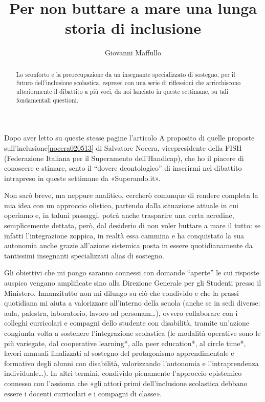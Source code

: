 \author{Giovanni Maffullo}
\title{Per non buttare a mare una lunga storia di inclusione }
\label{cha:maffullo100513}
\begin{abstract}
Lo sconforto e la preoccupazione da un insegnante specializzato di sostegno, per il futuro dell'inclusione scolastica, espressi con una serie di riflessioni che arricchiscono ulteriormente il dibattito a più voci, da noi lanciato in queste settimane, su tali fondamentali questioni. 
\end{abstract}
\maketitle
Dopo aver letto su queste stesse pagine l'articolo A proposito di quelle proposte sull'inclusione\ref{nocera020513} di Salvatore Nocera, vicepresidente della FISH (Federazione Italiana per il Superamento dell'Handicap), che ho il piacere di conoscere e stimare, sento il “dovere deontologico” di inserirmi nel dibattito intrapreso in queste settimane da «Superando.it».

Non sarò breve, ma neppure analitico, cercherò comunque di rendere completa la mia idea con un approccio olistico, partendo dalla situazione attuale in cui operiamo e, in taluni passaggi, potrà anche trasparire una certa acredine, semplicemente dettata, però, dal desiderio di non voler buttare a mare il tutto: se infatti l'integrazione zoppica, in realtà essa cammina e ha conquistato la sua autonomia anche grazie all'azione sistemica posta in essere quotidianamente da tantissimi insegnanti specializzati alias di sostegno.

Gli obiettivi che mi pongo saranno connessi con domande “aperte” le cui risposte auspico vengano amplificate sino alla Direzione Generale per gli Studenti presso il Ministero.
Innanzitutto non mi dilungo su ciò che condivido e che la prassi quotidiana mi aiuta a valorizzare all'interno della scuola (anche se in sedi diverse: aula, palestra, laboratorio, lavoro ad personam…), ovvero collaborare con i colleghi curricolari e compagni dello studente con disabilità, tramite un'azione congiunta volta a sostenere l'integrazione scolastica (le modalità operative sono le più variegate, dal cooperative learning*, alla peer education*, al circle time*, lavori manuali finalizzati al sostegno del protagonismo apprendimentale e formativo degli alunni con disabilità, valorizzando l'autonomia e l'intraprendenza individuale…). In altri termini, condivido pienamente l'approccio epistemico connesso con l'assioma che «gli attori primi dell'inclusione scolastica debbano essere i docenti curricolari e i compagni di classe».

